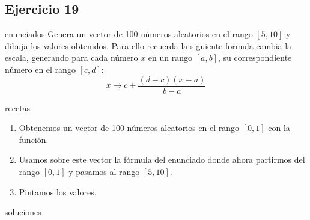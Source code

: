 \subsection{Ejercicio 19}
\def\parte{enunciados}
\ifx\capitulo\parte
Genera un vector de 100 números aleatorios en el rango $[5,10]$ y dibuja los valores obtenidos. Para ello recuerda la siguiente formula cambia la escala, generando para cada número $x$ en un rango $[a,b]$, su correspondiente número en el rango $[c,d]$:
\[x \longrightarrow c + \frac{(d-c)(x - a)}{b-a}\]
\fi

\def\parte{recetas}
\ifx\capitulo\parte
\begin{enumerate}
\item Obtenemos un vector de 100 números aleatorios en el rango $[0,1]$ con la función.
\item Usamos sobre este vector la fórmula del enunciado donde ahora partirmos del rango $[0,1]$ y pasamos al rango $[5,10]$.
\item Pintamos los valores.
\end{enumerate}
\fi

\def\parte{soluciones}
\ifx\capitulo\parte

\fi
